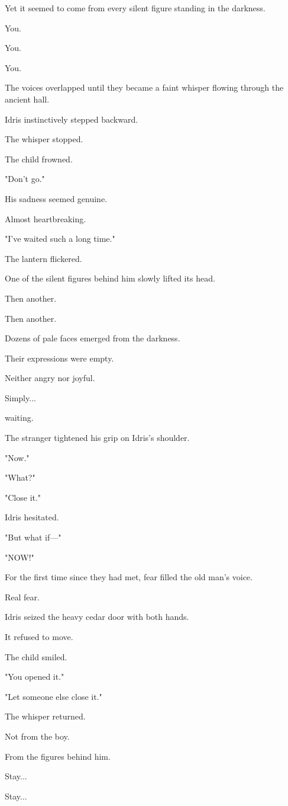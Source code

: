 \documentclass[12pt,openany]{book}
\begin{document}
Yet it seemed to come from every silent figure standing in the darkness.

You.

You.

You.

The voices overlapped until they became a faint whisper flowing through the ancient hall.

Idris instinctively stepped backward.

The whisper stopped.

The child frowned.

"Don't go."

His sadness seemed genuine.

Almost heartbreaking.

"I've waited such a long time."

The lantern flickered.

One of the silent figures behind him slowly lifted its head.

Then another.

Then another.

Dozens of pale faces emerged from the darkness.

Their expressions were empty.

Neither angry nor joyful.

Simply...

waiting.

The stranger tightened his grip on Idris's shoulder.

"Now."

"What?"

"Close it."

Idris hesitated.

"But what if—"

"NOW!"

For the first time since they had met, fear filled the old man's voice.

Real fear.

Idris seized the heavy cedar door with both hands.

It refused to move.

The child smiled.

"You opened it."

"Let someone else close it."

The whisper returned.

Not from the boy.

From the figures behind him.

Stay...

Stay...
\end{document}
